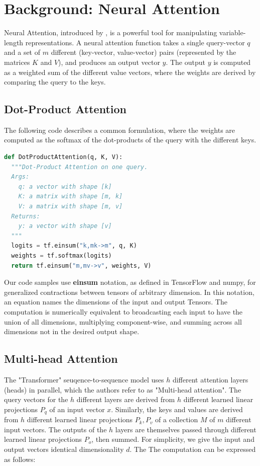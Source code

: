 \documentclass{article}
\begin{document}
\section{Background: Neural Attention}

Neural Attention, introduced by \citep{1409.0473}, is a powerful tool for manipulating variable-length representations.  A neural attention function takes a single query-vector $q$ and a set of $m$ different (key-vector, value-vector) pairs (represented by the matrices $K$ and $V$), and produces an output vector $y$.  The output $y$ is computed as a weighted sum of the different value vectors, where the weights are derived by comparing the query to the keys.

\subsection{Dot-Product Attention}

The following code describes a common formulation, where the weights are computed as the softmax of the dot-products of the query with the different keys.

\begin{minipage}{\linewidth}
\begin{lstlisting}[language=Python]
def DotProductAttention(q, K, V):
  """Dot-Product Attention on one query.
  Args:
    q: a vector with shape [k]
    K: a matrix with shape [m, k]
    V: a matrix with shape [m, v]
  Returns:
    y: a vector with shape [v]
  """
  logits = tf.einsum("k,mk->m", q, K)
  weights = tf.softmax(logits)
  return tf.einsum("m,mv->v", weights, V)
\end{lstlisting}
\end{minipage}

Our code samples use \textbf{einsum} notation, as defined in TensorFlow and numpy, for generalized contractions between tensors of arbitrary dimension.  In this notation, an equation names the dimensions of the input and output Tensors.  The computation is numerically equivalent to broadcasting each input to have the union of all dimensions, multiplying component-wise, and summing across all dimensions not in the desired output shape.


\subsection{Multi-head Attention}

The "Transformer" seuqence-to-sequence model \citep{Vas17} uses $h$ different attention layers (heads) in parallel, which the authors refer to as "Multi-head attention".  The query vectors for the $h$ different layers are derived from $h$ different learned linear projections $P_q$ of an input vector $x$.  Similarly, the keys and values are derived from $h$ different learned linear projections $P_k, P_v$ of a collection $M$ of $m$ different input vectors.  The outputs of the $h$ layers are themselves passed through different learned linear projections $P_o$, then summed.  For simplicity, we give the input and output vectors identical dimensionality $d$.  The The computation can be expressed as follows:
\end{document}
